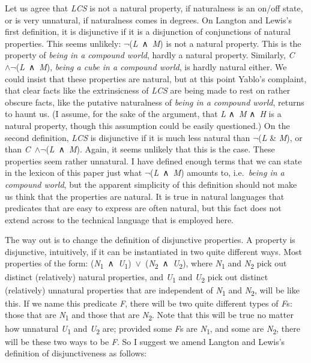 \documentclass[
  11pt,
  letterpaper,
  DIV=11,
  numbers=noendperiod,
  twoside]{scrartcl}
\begin{document}
Let us agree that \emph{LCS} is not a natural property, if naturalness
is an on/off state, or is very unnatural, if naturalness comes in
degrees. On Langton and Lewis's first definition, it is disjunctive if
it is a disjunction of conjunctions of natural properties. This seems
unlikely: \({\neg}\)(\emph{L}~∧~\emph{M}) is not a natural property.
This is the property of \emph{being in a compound world}, hardly a
natural property. Similarly,
\emph{C}~\(\wedge \neg\)(\emph{L}~∧~\emph{M}), \emph{being a cube in a
compound world}, is hardly natural either. We could insist that these
properties are natural, but at this point Yablo's complaint, that clear
facts like the extrinsicness of \emph{LCS} are being made to rest on
rather obscure facts, like the putative naturalness of \emph{being in a
compound world}, returns to haunt us. (I assume, for the sake of the
argument, that \emph{L} ∧~\emph{M} ∧~\emph{H} is a natural property,
though this assumption could be easily questioned.) On the second
definition, \emph{LCS} is disjunctive if it is much less natural than
\({\neg}\)(\emph{L} \& \emph{M}), or than
\emph{C}~\(\wedge \neg\)(\emph{L}~∧~\emph{M}). Again, it seems unlikely
that this is the case. These properties seem rather unnatural. I have
defined enough terms that we can state in the lexicon of this paper just
what \({\neg}\)(\emph{L}~∧~\emph{M}) amounts to, i.e.~\emph{being in a
compound world}, but the apparent simplicity of this definition should
not make us think that the properties are natural. It is true in natural
languages that predicates that are easy to express are often natural,
but this fact does not extend across to the technical language that is
employed here.

The way out is to change the definition of disjunctive properties. A
property is disjunctive, intuitively, if it can be instantiated in two
quite different ways. Most properties of the form:
(\emph{N}\textsubscript{1}~∧~\emph{U}\textsubscript{1})~\({\vee}\)~(\emph{N}\textsubscript{2}~∧~\emph{U}\textsubscript{2}),
where \emph{N}\textsubscript{1} and \emph{N}\textsubscript{2} pick out
distinct (relatively) natural properties, and \emph{U}\textsubscript{1}
and \emph{U}\textsubscript{2} pick out distinct (relatively) unnatural
properties that are independent of \emph{N}\textsubscript{1} and
\emph{N}\textsubscript{2}, will be like this. If we name this predicate
\emph{F}, there will be two quite different types of \emph{F}s: those
that are \emph{N}\textsubscript{1} and those that are
\emph{N}\textsubscript{2}. Note that this will be true no matter how
unnatural \emph{U}\textsubscript{1} and \emph{U}\textsubscript{2} are;
provided some \emph{F}s are \emph{N}\textsubscript{1}, and some are
\emph{N}\textsubscript{2}, there will be these two ways to be \emph{F}.
So I suggest we amend Langton and Lewis's definition of disjunctiveness
as follows:
\end{document}

